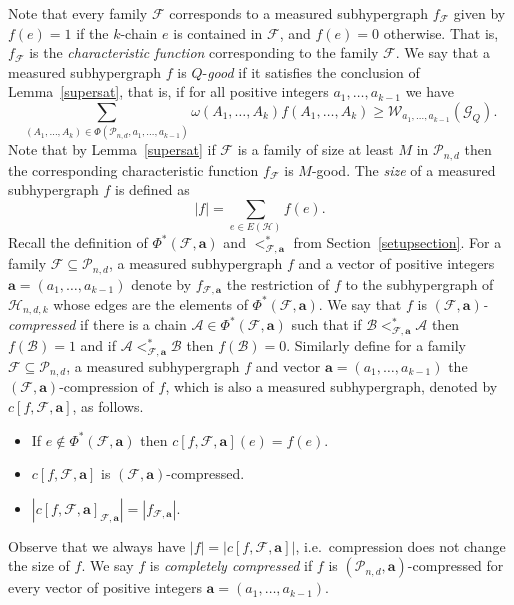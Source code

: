 \documentclass[12pt]{article}
\numberwithin{equation}{section}
\def\A{\mathcal{A}}
\def\B{\mathcal{B}}
\def\F{\mathcal{F}}
\def\G{\mathcal{G}}
\def\HH{\mathcal{H}}
\def\P{\mathcal{P}}
\def\W{\mathcal{W}}
\def\w{\omega}
\begin{document}
Note that every family $\F$ corresponds to a measured subhypergraph $f_\F$ given by $f(e)=1$ if the $k$-chain $e$ is contained in $\F$, and $f(e)=0$ otherwise. That is, $f_\F$ is the \emph{characteristic function} corresponding to the family $\F$. We say that a measured subhypergraph $f$ is $Q$-\emph{good} if it satisfies the conclusion of Lemma~\ref{supersat}, that is, if for all positive integers $a_1,\ldots,a_{k-1}$ we have
$$\sum_{(A_1,\ldots,A_k)\in\Phi(\P_{n,d},a_1,\ldots,a_{k-1})}\w(A_1,\ldots,A_k)f(A_1,\ldots,A_k)\geq \W_{a_1,\ldots,a_{k-1}}(\G_Q).$$
Note that by Lemma~\ref{supersat} if $\F$ is a family of size at least $M$ in $\P_{n,d}$ then the corresponding characteristic function $f_{\F}$ is $M$-good. The \emph{size} of a measured subhypergraph $f$ is defined as
$$|f|=\sum_{e\in E(\HH)}f(e).$$
Recall the definition of $\Phi^*(\F,\mathbf{a})$ and $<^*_{\F,\mathbf{a}}$ from Section~\ref{setupsection}. For a family $\F\subseteq \P_{n,d}$, a measured subhypergraph $f$ and a vector of positive integers $\mathbf{a}=(a_1,\ldots,a_{k-1})$ denote by $f_{\F,\mathbf{a}}$ the restriction of $f$ to the subhypergraph of $\HH_{n,d,k}$ whose edges are the elements of $\Phi^*(\F,\mathbf{a})$.  We say that $f$ is $(\F,\mathbf{a})$\emph{-compressed} if there is a chain $\A\in\Phi^*(\F,\mathbf{a})$ such that if $\B<^*_{\F,\mathbf{a}}\A$ then $f(\B)=1$ and if $\A<^*_{\F,\mathbf{a}}\B$ then $f(\B)=0$. Similarly define for a family $\F\subseteq \P_{n,d}$, a measured subhypergraph $f$ and vector $\mathbf{a}=(a_1,\ldots,a_{k-1})$ the $(\F,\mathbf{a})$-compression of $f$, which is also a measured subhypergraph, denoted by $c[f,\F,\mathbf{a}]$, as follows. 
\begin{itemize}
\item If $e\notin \Phi^*(\F,\mathbf{a})$ then $c[f,\F,\mathbf{a}](e)=f(e)$. 
\item $c[f,\F,\mathbf{a}]$ is $(\F,\mathbf{a})$-compressed.
\item $|c[f,\F,\mathbf{a}]_{\F,\mathbf{a}}|=|f_{\F,\mathbf{a}}|$.
\end{itemize}
Observe that we always have $|f|=|c[f,\F,\mathbf{a}]|$, i.e.~compression does not change the size of $f$. We say $f$ is \emph{completely compressed} if $f$ is $(\P_{n,d},\mathbf{a})$-compressed for every vector of positive integers $\mathbf{a}=(a_1,\ldots,a_{k-1})$.
\end{document}
